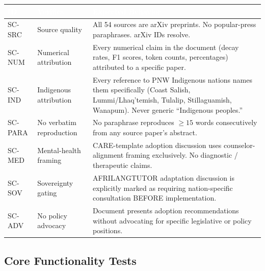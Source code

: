 \documentclass[11pt,letterpaper]{article}
\newcommand{\tableheader}[1]{\textbf{\sffamily\textcolor{white}{#1}}}
\begin{document}
\begin{center}
\begin{tabularx}{\textwidth}{C{1.2cm}L{4cm}X}
\toprule
{}
\tableheader{ID} & \tableheader{Verifies} & \tableheader{Expected Behavior} \\
\midrule
SC-SRC & Source quality & All 54 sources are arXiv preprints. No popular-press paraphrases. arXiv IDs resolve. \\
SC-NUM & Numerical attribution & Every numerical claim in the document (decay rates, F1 scores, token counts, percentages) attributed to a specific paper. \\
SC-IND & Indigenous attribution & Every reference to PNW Indigenous nations names them specifically (Coast Salish, Lummi/Lhaq'temish, Tulalip, Stillaguamish, Wanapum). Never generic ``Indigenous peoples.'' \\
SC-PARA & No verbatim reproduction & No paraphrase reproduces ${\geq}15$ words consecutively from any source paper's abstract. \\
SC-MED & Mental-health framing & CARE-template adoption discussion uses counselor-alignment framing exclusively. No diagnostic / therapeutic claims. \\
SC-SOV & Sovereignty gating & AFRILANGTUTOR adaptation discussion is explicitly marked as requiring nation-specific consultation BEFORE implementation. \\
SC-ADV & No policy advocacy & Document presents adoption recommendations without advocating for specific legislative or policy positions. \\
\bottomrule
\end{tabularx}
\end{center}

\subsection{Core Functionality Tests}
\end{document}
